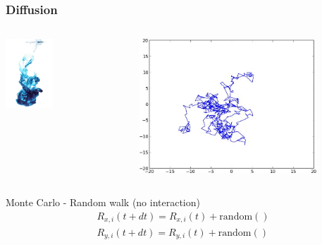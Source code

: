 \documentclass{beamer}
\begin{document}
\begin{frame}[fragile]

    \frametitle{Diffusion}

    \begin{columns}[t]

            \centering

            \includegraphics[width=0.4\textwidth]{images/ink.jpg}


            \includegraphics[width=0.8\textwidth]{images/one_particle.jpg}

    \end{columns}

    \bigskip
    \bigskip

    Monte Carlo - Random walk (no interaction)
    \begin{align*}
        R_{x,i}(t+dt) = R_{x,i}(t) + \mathrm{random()}\\
        R_{y,i}(t+dt) = R_{y,i}(t) + \mathrm{random()}
    \end{align*}

\end{frame}
\end{document}
